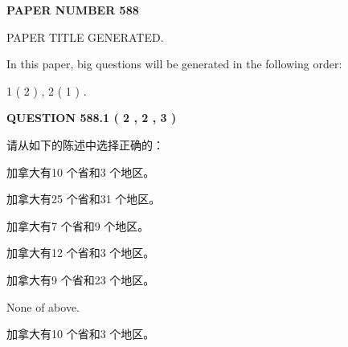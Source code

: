 \documentclass{ctexart}
\begin{document}
   
   
   
\newpage 
\setcounter{page}{ 
   588001 } 
   
   
   
   
 {\textbf{ \Large{ PAPER NUMBER  588  }}}
   
   
\vspace{0.2in}
   
   
   
   
   
   
   
   
 \vspace{0.2in}
 
 
 
 
   
   
 PAPER TITLE GENERATED.
   
   
   
\vspace{0.2in}
   
In this paper, big questions will be generated in the following order: 
   
   
   1 ( 2 )
 ,
   2 ( 1 )
 .
  
\vspace{0.2in}
  
{\textbf{\Large{QUESTION
588.1 
 ( 2 , 2 , 3 )
}}}
  
  
请从如下的陈述中选择正确的：
 
 
加拿大有10 个省和3 个地区。
 
 
加拿大有25 个省和31 个地区。
 
 
加拿大有7 个省和9 个地区。
 
 
加拿大有12 个省和3 个地区。
 
 
加拿大有9 个省和23 个地区。
 
 
 None of above.
 
 
\noindent{}
 
 
加拿大有10 个省和3 个地区。
 
 
\noindent{}
 
 
   
   
   
\end{document}
